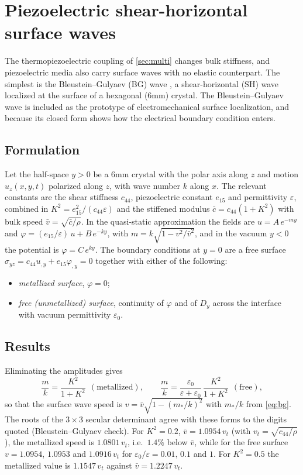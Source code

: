 \section{Piezoelectric shear-horizontal surface waves}\label{sec:bg}

The thermopiezoelectric coupling of \cref{sec:multi} changes bulk stiffness, and piezoelectric media also carry surface waves with no elastic counterpart. The simplest is the Bleustein--Gulyaev (BG) wave \citep{Bleustein1968,Gulyaev1969}, a shear-horizontal (SH) wave localized at the surface of a hexagonal (6mm) crystal. The Bleustein--Gulyaev wave is included as the prototype of electromechanical surface localization, and because its closed form shows how the electrical boundary condition enters.

\subsection{Formulation}
Let the half-space $y>0$ be a 6mm crystal with the polar axis along $z$ and motion $u_z(x,y,t)$ polarized along $z$, with wave number $k$ along $x$. The relevant constants are the shear stiffness $c_{44}$, piezoelectric constant $e_{15}$ and permittivity $\varepsilon$, combined in $K^2=e_{15}^2/(c_{44}\varepsilon)$ and the stiffened modulus $\bar c=c_{44}(1+K^2)$ with bulk speed $\bar v=\sqrt{\bar c/\rho}$. In the quasi-static approximation the fields are $u=A\,e^{-m y}$ and $\varphi=(e_{15}/\varepsilon)\,u+B\,e^{-ky}$, with $m=k\sqrt{1-v^2/\bar v^2}$, and in the vacuum $y<0$ the potential is $\varphi=C\,e^{ky}$. The boundary conditions at $y=0$ are a free surface $\sigma_{yz}=c_{44}u_{,y}+e_{15}\varphi_{,y}=0$ together with either of the following:
\begin{itemize}
\item \emph{metallized surface}, $\varphi=0$;
\item \emph{free (unmetallized) surface}, continuity of $\varphi$ and of $D_y$ across the interface with vacuum permittivity $\varepsilon_0$.
\end{itemize}

\subsection{Results}
Eliminating the amplitudes gives
\begin{equation}\label{eq:bg}
\frac{m}{k}=\frac{K^2}{1+K^2}\ \ (\text{metallized}),\qquad
\frac{m}{k}=\frac{\varepsilon_0}{\varepsilon+\varepsilon_0}\,\frac{K^2}{1+K^2}\ \ (\text{free}),
\end{equation}
so that the surface wave speed is $v=\bar v\sqrt{1-(m_\ast/k)^2}$ with $m_\ast/k$ from \cref{eq:bg}. The roots of the $3\times3$ secular determinant agree with these forms to the digits quoted (Bleustein--Gulyaev check). For $K^2=0.2$, $\bar v=1.0954\,v_t$ (with $v_t=\sqrt{c_{44}/\rho}$), the metallized speed is $1.0801\,v_t$, i.e.\ $1.4\%$ below $\bar v$, while for the free surface $v=1.0954$, $1.0953$ and $1.0916\,v_t$ for $\varepsilon_0/\varepsilon=0.01,\,0.1$ and $1$. For $K^2=0.5$ the metallized value is $1.1547\,v_t$ against $\bar v=1.2247\,v_t$.

